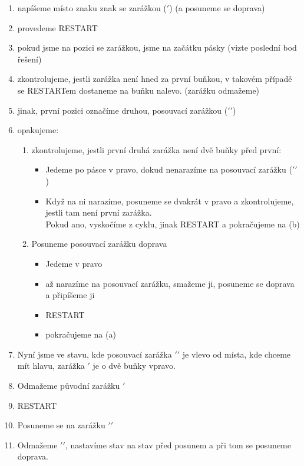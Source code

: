 \documentclass{article}
\begin{document}
\begin{enumerate}
    \item napíšeme místo znaku znak se zarážkou ($\prime$) (a posuneme se doprava)
    \item provedeme RESTART
    \item pokud jsme na pozici se zarážkou, jsme na začátku pásky (vizte poslední bod řešení)
    \item zkontrolujeme, jestli zarážka není hned za první buňkou, v takovém případě se RESTARTem dostaneme na buňku nalevo. (zarážku odmažeme)
    \item jinak, první pozici označíme druhou, posouvací zarážkou ($\prime\prime$)
    \item opakujeme:
    \begin{enumerate}
        \item zkontrolujeme, jestli první druhá zarážka není dvě buňky před první: 
        \begin{itemize}
            \item Jedeme po pásce v pravo, dokud nenarazíme na posouvací zarážku ($\prime\prime$)
            \item Když na ni narazíme, posuneme se dvakrát v pravo a zkontrolujeme, jestli tam není první zarážka. \\
            Pokud ano, vyskočíme z cyklu, jinak RESTART a pokračujeme na (b)
        \end{itemize}
        \item Posuneme posouvací zarážku doprava
       \begin{itemize}
        \item Jedeme v pravo
        \item až narazíme na posouvací zarážku, smažeme ji, posuneme se doprava a připíšeme ji
        \item RESTART
        \item pokračujeme na (a)
       \end{itemize}
    \end{enumerate}

    \item Nyní jsme ve stavu, kde posouvací zarážka $\prime\prime$ je vlevo od místa, kde chceme mít hlavu, zarážka $\prime$ je o dvě buňky vpravo.
    \item Odmažeme původní zarážku $\prime$
    \item RESTART
    \item Posuneme se na zarážku $\prime\prime$
    \item Odmažeme $\prime\prime$, nastavíme stav na stav před posunem a při tom se posuneme doprava.
\end{enumerate}
\end{document}
